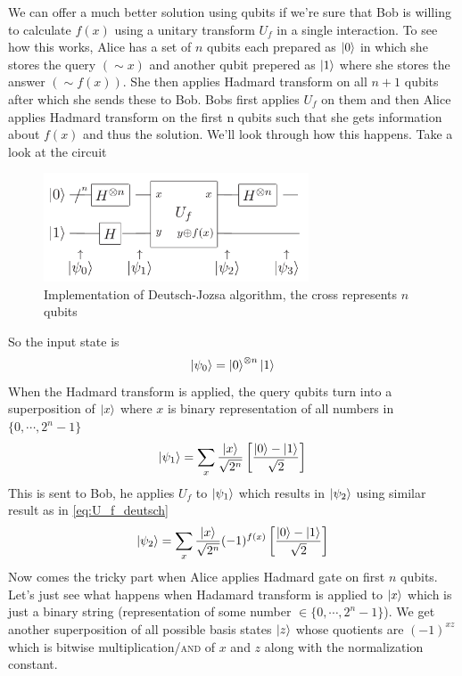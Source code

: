 We can offer a much better solution using qubits if we're sure that Bob is willing to calculate $f(x)$ using a unitary transform $U_f$ in a single interaction. To see how this works, Alice has a set of $n$ qubits each prepared as $\ket{0}$ in which she stores the query $(\sim x)$ and another qubit prepered as $\ket{1}$ where she stores the answer $(\sim f(x))$. She then applies Hadmard transform on all $n+1$ qubits after which she sends these to Bob. Bobs first applies $U_f$ on them and then Alice applies Hadmard transform on the first n qubits such that she gets information about $f(x)$ and thus the solution. We'll look through how this happens. Take a look at the circuit
\begin{figure}[H]
    \centering
    \includegraphics[width=0.7\textwidth]{images/deutsch_jozsa.png}
    \caption{Implementation of Deutsch-Jozsa algorithm, the cross represents $n$ qubits}
    \label{fig:deutsch-jozsa}
\end{figure}
So the input state is
\begin{equation}
    \ket{\psi_0} = \ket{0}^{\otimes n}\ket{1}
\end{equation}
When the Hadmard transform is applied, the query qubits turn into a superposition of $\ket{x}$ where $x$ is binary representation of all numbers in $\{ 0, \cdots, 2^n -1 \}$ 
\begin{equation}
    \ket{\psi_1} = \sum_{x} \frac{\ket{x}}{\sqrt{2^n}} \left[ \frac{\ket{0}-\ket{1}}{\sqrt{2}} \right]
\end{equation}
This is sent to Bob, he applies $U_f$ to $\ket{\psi_1}$ which results in $\ket{\psi_2}$ using similar result as in \ref{eq:U_f_deutsch}
\begin{equation}
    \ket{\psi_2} = \sum_x \frac{\ket{x}}{\sqrt{2^n}}(-1)^{f(x)}\left[ \frac{\ket{0}-\ket{1}}{\sqrt{2}}\right]
\end{equation}
Now comes the tricky part when Alice applies Hadmard gate on first $n$ qubits. Let's just see what happens when Hadamard transform is applied to $\ket{x}$ which is just a binary string (representation of some number $\in \{0,\cdots,2^n-1\}$). We get another superposition of all possible basis states $\ket{z}$ whose quotients are $(-1)^{xz}$ which is bitwise multiplication/\textsc{and} of $x$ and $z$ along with the normalization constant.
